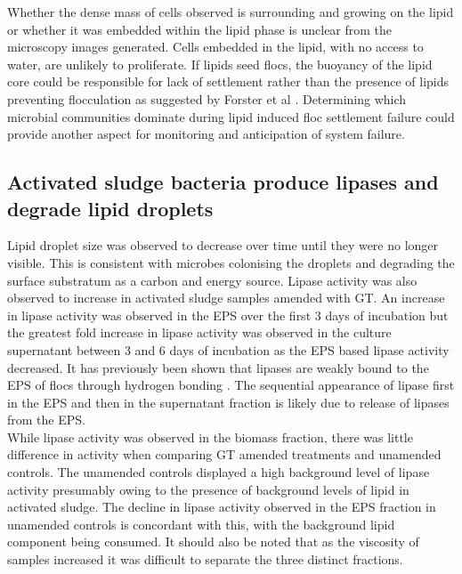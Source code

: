 \documentclass[twoside]{article}
\begin{document}
Whether the dense mass of cells observed is surrounding and growing on the lipid or whether it was embedded within the lipid phase is unclear from the microscopy images generated. Cells embedded in the lipid, with no access to water, are unlikely to proliferate. If lipids seed flocs, the buoyancy of the lipid core could be responsible for lack of settlement rather than the presence of lipids preventing flocculation as suggested by Forster et al \cite{Forster_92}. Determining which microbial communities dominate during lipid induced floc settlement failure could provide another aspect for monitoring and anticipation of system failure.

\subsection{Activated sludge bacteria produce lipases and degrade lipid droplets}

Lipid droplet size was observed to decrease over time until they were no longer visible. This is consistent with microbes colonising the droplets and degrading the surface substratum as a carbon and energy source. Lipase activity was also observed to increase in activated sludge samples amended with GT. An increase in lipase activity was observed in the EPS over the first 3 days of incubation but the greatest fold increase in lipase activity was observed in the culture supernatant between 3 and 6 days of incubation as the EPS based lipase activity decreased. It has previously been shown that lipases are weakly bound to the EPS of flocs through hydrogen bonding \cite{mayer1999role,wicker1987}. The sequential appearance of lipase first in the EPS and then in the supernatant fraction is likely due to release of lipases from the EPS.\\

While lipase activity was observed in the biomass fraction, there was little difference in activity when comparing GT amended treatments and unamended controls. The unamended controls displayed a high background level of lipase activity presumably owing to the presence of background levels of lipid in activated sludge. The decline in lipase activity observed in the EPS fraction in unamended controls is concordant with this, with the background lipid component being consumed. It should also be noted that as the viscosity of samples increased it was difficult to separate the three distinct fractions.
\end{document}
